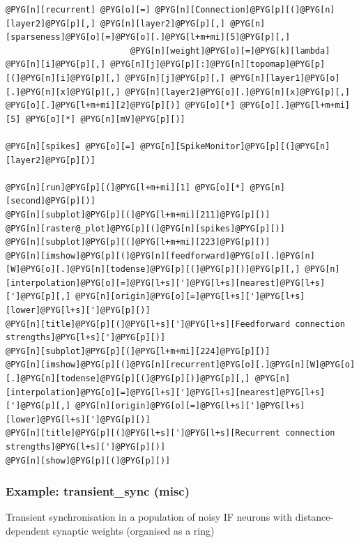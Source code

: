 \documentclass[letterpaper,10pt,english]{manual}
\begin{document}
\begin{Verbatim}[commandchars=@\[\]]
@PYG[n][recurrent] @PYG[o][=] @PYG[n][Connection]@PYG[p][(]@PYG[n][layer2]@PYG[p][,] @PYG[n][layer2]@PYG[p][,] @PYG[n][sparseness]@PYG[o][=]@PYG[o][.]@PYG[l+m+mi][5]@PYG[p][,]
                         @PYG[n][weight]@PYG[o][=]@PYG[k][lambda] @PYG[n][i]@PYG[p][,] @PYG[n][j]@PYG[p][:]@PYG[n][topomap]@PYG[p][(]@PYG[n][i]@PYG[p][,] @PYG[n][j]@PYG[p][,] @PYG[n][layer1]@PYG[o][.]@PYG[n][x]@PYG[p][,] @PYG[n][layer2]@PYG[o][.]@PYG[n][x]@PYG[p][,] @PYG[o][.]@PYG[l+m+mi][2]@PYG[p][)] @PYG[o][*] @PYG[o][.]@PYG[l+m+mi][5] @PYG[o][*] @PYG[n][mV]@PYG[p][)]

@PYG[n][spikes] @PYG[o][=] @PYG[n][SpikeMonitor]@PYG[p][(]@PYG[n][layer2]@PYG[p][)]

@PYG[n][run]@PYG[p][(]@PYG[l+m+mi][1] @PYG[o][*] @PYG[n][second]@PYG[p][)]
@PYG[n][subplot]@PYG[p][(]@PYG[l+m+mi][211]@PYG[p][)]
@PYG[n][raster@_plot]@PYG[p][(]@PYG[n][spikes]@PYG[p][)]
@PYG[n][subplot]@PYG[p][(]@PYG[l+m+mi][223]@PYG[p][)]
@PYG[n][imshow]@PYG[p][(]@PYG[n][feedforward]@PYG[o][.]@PYG[n][W]@PYG[o][.]@PYG[n][todense]@PYG[p][(]@PYG[p][)]@PYG[p][,] @PYG[n][interpolation]@PYG[o][=]@PYG[l+s][']@PYG[l+s][nearest]@PYG[l+s][']@PYG[p][,] @PYG[n][origin]@PYG[o][=]@PYG[l+s][']@PYG[l+s][lower]@PYG[l+s][']@PYG[p][)]
@PYG[n][title]@PYG[p][(]@PYG[l+s][']@PYG[l+s][Feedforward connection strengths]@PYG[l+s][']@PYG[p][)]
@PYG[n][subplot]@PYG[p][(]@PYG[l+m+mi][224]@PYG[p][)]
@PYG[n][imshow]@PYG[p][(]@PYG[n][recurrent]@PYG[o][.]@PYG[n][W]@PYG[o][.]@PYG[n][todense]@PYG[p][(]@PYG[p][)]@PYG[p][,] @PYG[n][interpolation]@PYG[o][=]@PYG[l+s][']@PYG[l+s][nearest]@PYG[l+s][']@PYG[p][,] @PYG[n][origin]@PYG[o][=]@PYG[l+s][']@PYG[l+s][lower]@PYG[l+s][']@PYG[p][)]
@PYG[n][title]@PYG[p][(]@PYG[l+s][']@PYG[l+s][Recurrent connection strengths]@PYG[l+s][']@PYG[p][)]
@PYG[n][show]@PYG[p][(]@PYG[p][)]
\end{Verbatim}

\resetcurrentobjects
\hypertarget{--doc-examples-misc_transient_sync}{}

\hypertarget{index-71}{}\subsubsection{Example: transient\_sync (misc)}

Transient synchronisation in a population of noisy IF neurons
with distance-dependent synaptic weights (organised as a ring)
\end{document}
